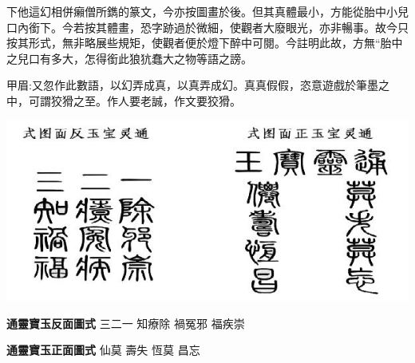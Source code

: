 \begin{parag}
下他這幻相併癩僧所鐫的篆文，今亦按圖畫於後。但其真體最小，方能從胎中小兒口內銜下。今若按其體畫，恐字跡過於微細，使觀者大廢眼光，亦非暢事。故今只按其形式，無非略展些規矩，使觀者便於燈下醉中可閱。今註明此故，方無“胎中之兒口有多大，怎得銜此狼犺蠢大之物等語之謗。\begin{note}甲眉:又忽作此數語，以幻弄成真，以真弄成幻。真真假假，恣意遊戲於筆墨之中，可謂狡猾之至。作人要老誠，作文要狡猾。\end{note}
\end{parag}

\includegraphics{1-80/8-1}

\begin{qute}

    \begin{parag}\textbf{通靈寶玉反面圖式} \newline
        \indent 三二一\newline
        \indent 知療除\newline
        \indent 禍冤邪\newline
        \indent 福疾崇\newline
    \end{parag}


    \begin{parag}
        \textbf{通靈寶玉正面圖式}\newline
        \indent 仙莫\newline
        \indent 壽失\newline
        \indent 恆莫\newline
        \indent 昌忘\newline
    \end{parag}
\end{qute}


